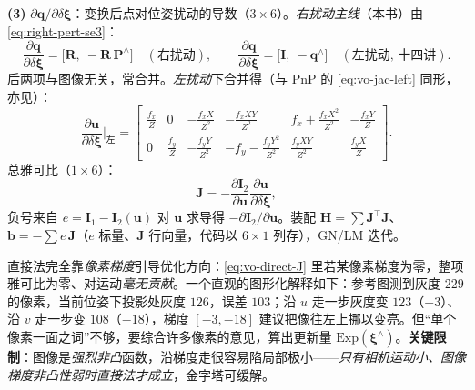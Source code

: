 \begin{derivation}
\textbf{(3)} $\partial\mathbf{q}/\partial\delta\boldsymbol{\xi}$：变换后点对位姿扰动的导数（$3\times6$）。\emph{右扰动主线}（本书）由 \cref{eq:right-pert-se3}：
\begin{equation}
  \frac{\partial\mathbf{q}}{\partial\delta\boldsymbol{\xi}}=\big[\mathbf{R},\ -\mathbf{R}\,\mathbf{P}^\wedge\big]\quad(\text{右扰动}),\qquad
  \frac{\partial\mathbf{q}}{\partial\delta\boldsymbol{\xi}}=\big[\mathbf{I},\ -\mathbf{q}^\wedge\big]\quad(\text{左扰动, 十四讲}).
  \label{eq:vo-direct-dqxi}
\end{equation}
后两项与图像无关，常合并。\emph{左扰动}下合并得（与 PnP 的 \cref{eq:vo-jac-left} 同形，亦见\cite{gaoxiang2019slam14}）：
\begin{equation}
  \frac{\partial\mathbf{u}}{\partial\delta\boldsymbol{\xi}}\Big|_{\text{左}}=\begin{bmatrix}
  \frac{f_x}{Z}&0&-\frac{f_xX}{Z^2}&-\frac{f_xXY}{Z^2}&f_x+\frac{f_xX^2}{Z^2}&-\frac{f_xY}{Z}\\
  0&\frac{f_y}{Z}&-\frac{f_yY}{Z^2}&-f_y-\frac{f_yY^2}{Z^2}&\frac{f_yXY}{Z^2}&\frac{f_yX}{Z}
  \end{bmatrix}.
  \label{eq:vo-direct-merge}
\end{equation}
总雅可比（$1\times6$）：
\begin{equation}
  \mathbf{J}=-\frac{\partial\mathbf{I}_2}{\partial\mathbf{u}}\frac{\partial\mathbf{u}}{\partial\delta\boldsymbol{\xi}},
  \label{eq:vo-direct-J}
\end{equation}
负号来自 $e=\mathbf{I}_1-\mathbf{I}_2(\mathbf{u})$ 对 $\mathbf{u}$ 求导得 $-\partial\mathbf{I}_2/\partial\mathbf{u}$。装配 $\mathbf{H}=\sum\mathbf{J}^\top\mathbf{J}$、$\mathbf{b}=-\sum e\,\mathbf{J}$（$e$ 标量、$\mathbf{J}$ 行向量，代码以 $6\times1$ 列存），GN/LM 迭代。
\end{derivation}

\begin{insight}[像素梯度引导优化方向]
直接法完全靠\emph{像素梯度}引导优化方向：\cref{eq:vo-direct-J} 里若某像素梯度为零，整项雅可比为零、对运动\emph{毫无贡献}。一个直观的图形化解释如下：参考图测到灰度 $229$ 的像素，当前位姿下投影处灰度 $126$，误差 $103$；沿 $u$ 走一步灰度变 $123$（$-3$）、沿 $v$ 走一步变 $108$（$-18$），梯度 $[-3,-18]$ 建议把像往左上挪以变亮。但“单个像素一面之词”不够，要综合许多像素的意见，算出更新量 $\mathrm{Exp}(\boldsymbol{\xi}^\wedge)$\cite{gaoxiang2019slam14}。\textbf{关键限制}：图像是\emph{强烈非凸}函数，沿梯度走很容易陷局部极小——\emph{只有相机运动小、图像梯度非凸性弱时直接法才成立}，金字塔可缓解。
\end{insight}

